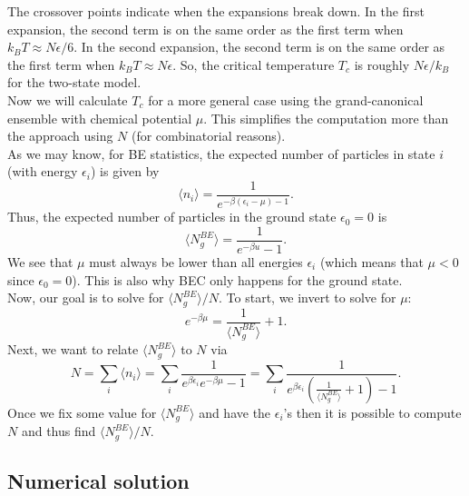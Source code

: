 \documentclass{book}
\theoremstyle{definition}
\newcommand{\be}{\beta}
\newcommand{\f}[2]{\frac{#1}{#2}}
\newcommand{\lp}{\left(}
\newcommand{\rp}{\right)}
\begin{document}
The crossover points indicate when the expansions break down. In the first expansion, the second term is on the same order as the first term when $k_B T\approx N\epsilon/6$. In the second expansion, the second term is on the same order as the first term when $k_BT\approx N\epsilon$. So, the critical temperature $T_c$ is roughly $N\epsilon / k_B$ for the two-state model. \\


Now we will calculate $T_c$ for a more general case using the grand-canonical ensemble with chemical potential $\mu$. This simplifies the computation more than the approach using $N$ (for combinatorial reasons). \\


As we may know, for BE statistics, the expected number of particles in state $i$ (with energy $\epsilon_i$) is given by 
\begin{equation*}
\langle n_i \rangle = \f{1}{e^{-\be(\epsilon_i - \mu) - 1}}.
\end{equation*}
Thus, the expected number of particles in the ground state $\epsilon_0 = 0$ is 
\begin{equation*}
\langle N_g^{BE}\rangle = \f{1}{e^{-\beta u} -1}.
\end{equation*}
We see that $\mu$ must always be lower than all energies $\epsilon_i$ (which means that $\mu < 0$ since $\epsilon_0 = 0$). This is also why BEC only happens for the ground state.\\


Now, our goal is to solve for $\langle N_g^{BE}\rangle/N$. To start, we invert to solve for $\mu$:
\begin{equation*}
e^{-\beta \mu} = \f{1}{\langle N_g^{BE} \rangle} + 1.
\end{equation*}
Next, we want to relate $\langle N_g^{BE} \rangle$ to $N$ via 
\begin{equation*}
N = \sum_i \langle n_i \rangle  = \sum_i \f{1}{e^{\beta\epsilon_i} e^{-\be\mu} - 1} = \sum_i \f{1}{e^{\be\epsilon_i} \lp \f{1}{\langle N_g^{BE}\rangle} + 1 \rp - 1 }.
\end{equation*}
Once we fix some value for $\langle N_g^{BE}\rangle$ and have the $\epsilon_i$'s then it is possible to compute $N$ and thus find $\langle N_g^{BE}\rangle / N$. 


\subsection*{Numerical solution}
\end{document}

